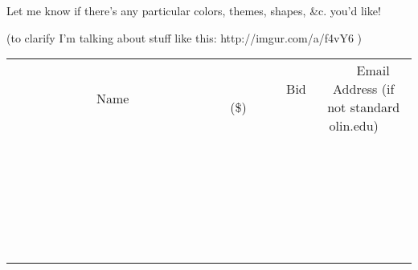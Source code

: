 \documentclass[11pt]{article}
\begin{document}
Let me know if there's any particular colors, themes, shapes, \&c. you'd like!

(to clarify I'm talking about stuff like this: http://imgur.com/a/f4vY6 )
\\[6ex]
\begin{tabular}{c c c}
~~~~~~~~~~~~~Name~~~~~~~~~~~~~ & ~~~~~~~~~Bid (\$)~~~~~~~~~  & ~~~Email Address (if not standard olin.edu)~~~\\
 & & \\
\hline
 & & \\
\hline
 & & \\
\hline
 & & \\
\hline
 & & \\
\hline
 & & \\
\hline
 & & \\
\hline
 & & \\
\hline
 & & \\
\hline
 & & \\
\hline
 & & \\
\hline
 & & \\
\hline
 & & \\
\hline
 & & \\
\hline
 & & \\
\hline
 & & \\
\hline
 & & \\
\hline
 & & \\
\hline
 & & \\
\hline
 & & \\
\hline
 & & \\
\hline
 & & \\
\hline
 & & \\
\hline
 & & \\
\hline
 & & \\
\hline
 & & \\
\hline
\end{tabular}
\newpage
\end{document}
